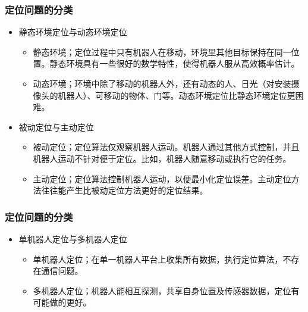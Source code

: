 \begin{frame}
  \frametitle{定位问题的分类}
  \begin{itemize}
    \item 静态环境定位与动态环境定位
    \begin{itemize}
      \item 静态环境；定位过程中只有机器人在移动，环境里其他目标保持在同一位置。静态环境具有一些很好的数学特性，使得机器人服从高效概率估计。
      \item 动态环境；环境中除了移动的机器人外，还有动态的人、日光（对安装摄像头的机器人）、可移动的物体、门等。动态环境定位比静态环境定位更困难。
    \end{itemize}
    \item 被动定位与主动定位
    \begin{itemize}
      \item 被动定位；定位算法仅观察机器人运动。机器人通过其他方式控制，并且机器人运动不针对便于定位。比如，机器人随意移动或执行它的任务。
      \item 主动定位；定位算法控制机器人运动，以便最小化定位误差。主动定位方法往往能产生比被动定位方法更好的定位结果。
    \end{itemize}
  \end{itemize}
  
\end{frame}

\begin{frame}
  \frametitle{定位问题的分类}
  \begin{itemize}
    \item 单机器人定位与多机器人定位
    \begin{itemize}
      \item 单机器人定位；在单一机器人平台上收集所有数据，执行定位算法，不存在通信问题。
      \item 多机器人定位；机器人能相互探测，共享自身位置及传感器数据，定位有可能做的更好。
    \end{itemize}
  \end{itemize}
\end{frame}


